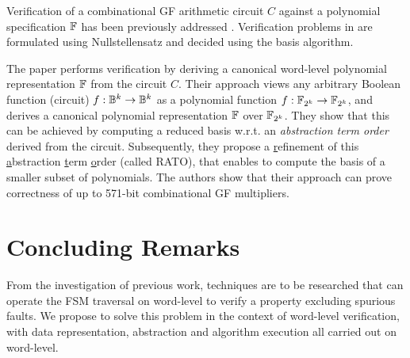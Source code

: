 Verification of a combinational GF arithmetic circuit $C$ against a
polynomial specification ${\mathbb{F}}$ has been previously addressed \cite{ibm:blueveri}
\cite{lv:tcad2013} \cite{pruss:dac14}. Verification problems in
\cite{ibm:blueveri} \cite{lv:tcad2013} are formulated using
Nullstellensatz and decided using the \Grobner basis algorithm.

The paper 
\cite{pruss:dac14} performs verification by deriving a canonical
word-level polynomial representation ${\mathbb{F}}$ from the circuit $C$. Their
approach views any arbitrary Boolean function (circuit) $f: {\mathbb{B}}^k
\rightarrow {\mathbb{B}}^k$ as a polynomial function $f: {\mathbb{F}}_{2^k} \rightarrow {\mathbb{F}}_{2^k}$,
and derives a canonical polynomial representation ${\mathbb{F}}$ over
${\mathbb{F}}_{2^k}$. They show that this can be achieved by computing a reduced 
\Grobner basis w.r.t. an {\it abstraction term order} derived from the
circuit. Subsequently, they propose a \underline{r}efinement of this
\underline{a}bstraction \underline{t}erm \underline{o}rder (called
RATO), that enables to compute the \Grobner basis of a smaller subset
of polynomials. The authors show that their approach can prove
correctness of up to 571-bit combinational GF multipliers. 

\section{Concluding Remarks}
From the investigation of previous work, techniques are to be researched that 
can operate the FSM traversal on word-level to verify a property excluding spurious 
faults. We propose to solve this problem in the context of word-level verification,
with data representation, abstraction and algorithm execution all carried out 
on word-level.